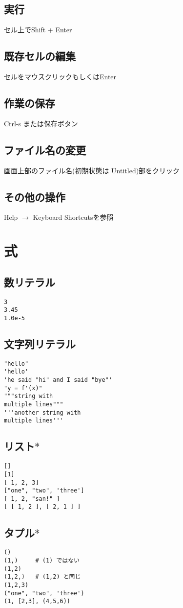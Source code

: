 \documentclass[landscape,7pt,dvipdfmx]{article}
\begin{document}
\begin{multicols*}{3}
\subsection{実行}
セル上でShift + Enter
\subsection{既存セルの編集}
セルをマウスクリックもしくはEnter
\subsection{作業の保存}
Ctrl-s または保存ボタン
\subsection{ファイル名の変更}
画面上部のファイル名(初期状態は Untitled)部をクリック
\subsection{その他の操作}
Help $\rightarrow$ Keyboard Shortcutsを参照

\section{式}
\subsection{数リテラル}
\begin{lstlisting}
3
3.45
1.0e-5
\end{lstlisting}
\subsection{文字列リテラル}
\begin{lstlisting}
"hello"
'hello'
'he said "hi" and I said "bye"'
"y = f'(x)"
"""string with
multiple lines"""
'''another string with
multiple lines'''
\end{lstlisting}
\subsection{リスト$\ast$}
\begin{lstlisting}
[]
[1]
[ 1, 2, 3]
["one", "two", 'three']
[ 1, 2, "san!" ]
[ [ 1, 2 ], [ 2, 1 ] ]
\end{lstlisting}
\subsection{タプル$\ast$}
\begin{lstlisting}
()
(1,)     # (1) ではない
(1,2)
(1,2,)   # (1,2) と同じ
(1,2,3)
("one", "two", 'three')
(1, [2,3], (4,5,6))
\end{lstlisting}


\end{multicols*}
\end{document}

